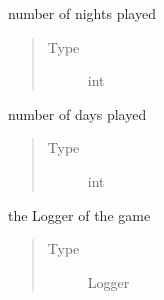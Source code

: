 \documentclass[letterpaper,10pt,english]{sphinxmanual}
\begin{document}
\begin{fulllineitems}
\begin{fulllineitems}
\begin{quote}
\begin{description}
\end{description}\end{quote}

\end{fulllineitems}


\begin{fulllineitems}
\label{\detokenize{chatwolf:chatwolf.game.Game.nn}}
number of nights played
\begin{quote}\begin{description}
\item[{Type}] \leavevmode
int

\end{description}\end{quote}

\end{fulllineitems}


\begin{fulllineitems}
\label{\detokenize{chatwolf:chatwolf.game.Game.nd}}
number of days played
\begin{quote}\begin{description}
\item[{Type}] \leavevmode
int

\end{description}\end{quote}

\end{fulllineitems}


\begin{fulllineitems}
\label{\detokenize{chatwolf:chatwolf.game.Game.log}}
the Logger of the game
\begin{quote}\begin{description}
\item[{Type}] \leavevmode
Logger

\end{description}\end{quote}

\end{fulllineitems}


\end{fulllineitems}
\end{document}
